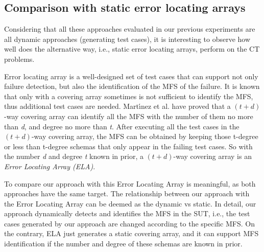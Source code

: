 \documentclass[10pt,journal,compsoc]{IEEEtran}
\begin{document}
{\color{blue}\subsection{Comparison with static error locating arrays}
Considering  that all these approaches evaluated in our previous  experiments are all dynamic approaches (generating test cases), it is interesting to observe how well does the alternative way,  i.e., static error locating arrays, perform on the CT problems.

Error locating array\cite{colbourn2008locating,martinez2009locating} is a well-designed set of test cases that can support not only failure detection, but also the identification of the MFS of the failure. It is known that only with a covering array sometimes is not sufficient to identify the MFS, thus additional test cases are needed. Mart{\'\i}nez et al.\cite{martinez2008algorithms} have proved that a $(t + d)$-way covering array can identify all the MFS with the number of them no more than \emph{d}, and degree no more than \emph{t}.
After executing all the test cases in the $(t + d)$-way covering array, the MFS can be obtained by keeping those t-degree or less than t-degree schemas that only appear in the failing test cases.  So with the number \emph{d} and degree \emph{t} known in prior, a $(t + d)$-way covering array is an \emph{Error Locating Array (ELA)}.


To compare our approach with this Error Locating Array is meaningful, as both approaches have the same target. The relationship between our approach with the Error Locating Array can be deemed as the dynamic vs static. In detail, our approach dynamically detects and identifies the MFS in the SUT, i.e., the test cases generated by our approach are changed according to the specific MFS. On the contrary, ELA just generates a static covering array, and it can support MFS identification if the number and degree of these schemas are known in prior.



}
\end{document}
